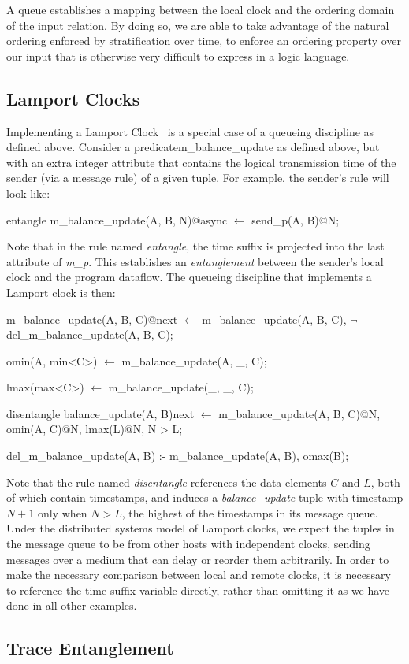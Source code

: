 A queue establishes a mapping between the local clock and the ordering domain of the input relation. By doing so, we are able to take
advantage of the natural ordering enforced by stratification over time, to enforce an ordering property over our input that is otherwise 
very difficult to express in a logic language.

\subsection{Lamport Clocks}

Implementing a Lamport Clock~\cite{timeclocks} is a special case of a queueing discipline as defined above.
Consider a predicate{m\_balance\_update} as defined above, but with an extra integer attribute that contains the logical transmission
time of the sender (via a message rule) of a given tuple.  For example, the sender's rule will look like: 


\begin{Dedalus}
entangle
m\_balance\_update(A, B, N)@async \(\leftarrow\)
  send\_p(A, B)@N;
\end{Dedalus}

Note that in the rule named \emph{entangle}, the time suffix is projected into the last attribute of \emph{m\_p}.  
This establishes an \emph{entanglement} between
the sender's local clock and the program dataflow.  The queueing discipline that implements a
Lamport clock is then:

\begin{Dedalus}

m\_balance\_update(A, B, C)@next \(\leftarrow\)
  m\_balance\_update(A, B, C),
  \(\lnot\) del\_m\_balance\_update(A, B, C);

omin(A, min<C>) \(\leftarrow\)
  m\_balance\_update(A, _, C);

lmax(max<C>) \(\leftarrow\)
  m\_balance\_update(_, _, C);

disentangle
balance_update(A, B)next \(\leftarrow\)
  m\_balance\_update(A, B, C)@N,
  omin(A, C)@N,
  lmax(L)@N,
  N > L;

del\_m\_balance\_update(A, B) :-
  m\_balance\_update(A, B),
  omax(B);
  
\end{Dedalus}

Note that the rule named \emph{disentangle} references the data elements $C$ and $L$, both of which
contain timestamps, and induces a \emph{balance\_update} tuple with timestamp $N+1$ only when $N > L$,
the highest of the timestamps in its message queue.  Under the distributed systems model of Lamport clocks, 
we expect the tuples in the message queue to  be from other hosts with independent clocks, sending messages 
over a medium that can delay or reorder them arbitrarily.  In order to make the necessary comparison between local
and remote clocks, it is necessary to reference the time suffix variable directly, rather than omitting it as we have done 
in all other \lang examples.

\subsection{Trace Entanglement}


